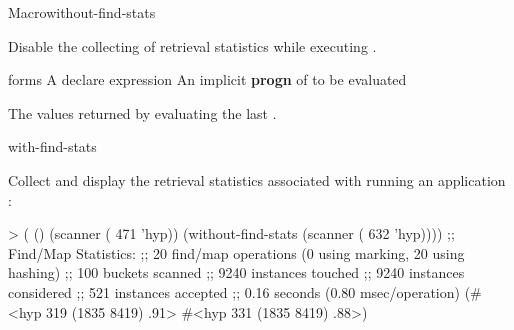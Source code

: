 \documentclass[10pt,twoside,english,pdftex]{article}
\begin{document}

\begin{functiondoc}{Macro}{without-find-stats}%
  {\superstar{}
    \superstar{}
    \returns{} \superstar} 
%
%
%
  
\fnsyntax

\fnpurpose 
{}%
%
Disable the collecting of retrieval statistics while executing .

\fnpackage {}

\fnmodule {}

\fnargs
\begin{args}{forms}
\arg[declaration] A declare expression
\arg[forms] An implicit \textbf{progn} of  to be evaluated
\end{args}

\fnreturns The values returned by evaluating the last .

\begin{alsos}{with-find-stats}
\end{alsos}

\fnexample
{}%
%
Collect and display the retrieval statistics associated with
running an application  :
\begin{example}
> ( ()
     (scanner ( 471 'hyp))
     (without-find-stats
        (scanner ( 632 'hyp))))
;; Find/Map Statistics:
;;        20 find/map operations (0 using marking, 20 using hashing)
;;       100 buckets scanned
;;      9240 instances touched
;;      9240 instances considered
;;       521 instances accepted
;;      0.16 seconds (0.80 msec/operation)
(#<hyp 319 (1835 8419) .91>
 #<hyp 331 (1835 8419) .88>)
\end{example}

\end{functiondoc}


\T\markright{}%
\T\pagestyle{plain}
\T\clearpage
\W{}
\T\pagestyle{fancy}
\T\thispagestyle{fancybottom}
\T\global\def\fnlastname{ }%
\end{document}
